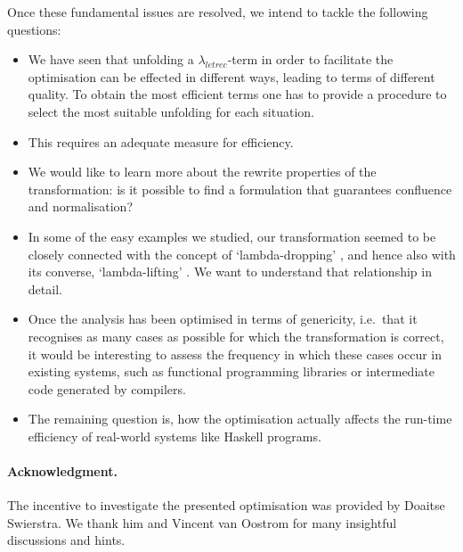 \documentclass[submission,copyright,creativecommons]{eptcs}
\newcommand{\lambdaletrec}{\ensuremath{\lambda_\textit{letrec}}}
\renewcommand\;{\,}
\begin{document}
Once these fundamental issues are resolved, we intend to tackle the following questions: \begin{itemize}
  \item We have seen that unfolding a \lambdaletrec-term in order to facilitate
  the optimisation can be effected in different ways, leading to terms of
  different quality. To obtain the most efficient terms one has to provide a
  procedure to select the most suitable unfolding for each situation.
  \item This requires an adequate measure for efficiency.
  \item We would like to learn more about the rewrite properties of the transformation:
    is it possible to find a formulation that guarantees confluence and normalisation?
\item In some of the easy examples we studied, our transformation seemed to be
    closely connected with the concept of `lambda-dropping' \cite{danv:schu:1997,danv:1999},
    and hence also with its converse, `lambda-lifting' \cite{john:1985,peyt:jone:1987,danv:schu:2002}.
    We want to understand that relationship in detail. 
\item Once the analysis has been optimised in terms of genericity, i.e.\ that
  it recognises as many cases as possible for which the transformation is
  correct, it would be interesting to assess the frequency in which these cases
  occur in existing systems, such as functional programming libraries or
  intermediate code generated by compilers.
  \item The remaining question is, how the optimisation actually affects the
  run-time efficiency of real-world systems like Haskell programs.
\end{itemize}









\paragraph{Acknowledgment.}
The incentive to investigate the presented optimisation was provided by
  Doaitse Swierstra. We thank him and Vincent van Oostrom for many insightful
  discussions and hints.



\end{document}
